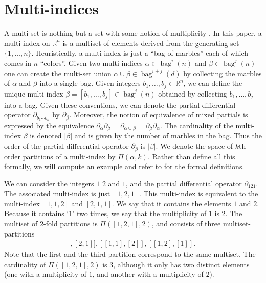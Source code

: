 \documentclass[12pt]{amsart}
\newcommand{\R}{\ensuremath{\mathbb{R}}}
\DeclareMathOperator{\bag}{bag}
\begin{document}
\section{Multi-indices}
\label{app:multi}
A multi-set is nothing but a set with some notion of multiplicity \cite{Blizard1989}.
In this paper, a multi-index on $\R^n$ is a multiset of elements derived from the generating set $\{1,\dots,n\}$.
Heuristically, a multi-index is just a ``bag of marbles'' each of which comes in $n$ ``colors''.
Given two multi-indices $\alpha \in \bag^i(n)$ and $\beta \in \bag^j(n)$ one can create the
multi-set union $\alpha \cup \beta \in \bag^{i+j}(d)$ by collecting the marbles of $\alpha$ and $\beta$ into a single bag.
Given integers $b_1,\dots,b_j \in \R^n$, we can define the unique multi-index $\beta = [b_1,\dots,b_j] \in \bag^j(n)$
obtained by collecting $b_1,\dots,b_j$ into a bag.
Given these conventions, we can denote the partial differential operator $\partial_{b_1 \cdots b_n }$ by $\partial_\beta$.
Moreover, the notion of equivalence of mixed partials is expressed by the equivalence 
$\partial_\alpha \partial_\beta = \partial_{\alpha \cup \beta} = \partial_\beta \partial_\alpha$.
The cardinality of the multi-index $\beta$ is denoted $|\beta|$ and is given by the number of marbles in the bag.
Thus the order of the partial differential operator $\partial_{\beta}$ is $|\beta|$.
We denote the space of $k$th order partitions of a multi-index by $\Pi(\alpha,k)$.
Rather than define all this formally, we will compute an example and refer to \cite{Jacobs2014b} for the formal definitions.

We can consider the integers $1$ $2$ and $1$, and the partial differential operator $\partial_{121}$.
The associated multi-index is just $[1,2,1]$.  This multi-index is equivalent to the multi-index $[1,1,2]$ and $[2,1,1]$.
We say that it contains the elements $1$ and $2$.
Because it contains `$1$' two times, we say that the multiplicity of $1$ is $2$.
The multiset of $2$-fold partitions is $\Pi( [1,2,1],2)$, and consists of three multiset-partitions
\begin{align*}
	[ [1] , [2,1] ] , [[1,1] , [2] ] , [ [1, 2] , [1] ].
\end{align*}
Note that the first and the third partition correspond to the same multiset.
The cardinality of $\Pi( [1,2,1],2)$ is $3$, although it only has two distinct elements (one with a multiplicity of $1$, and another with a multiplicity of $2$).
\end{document}
